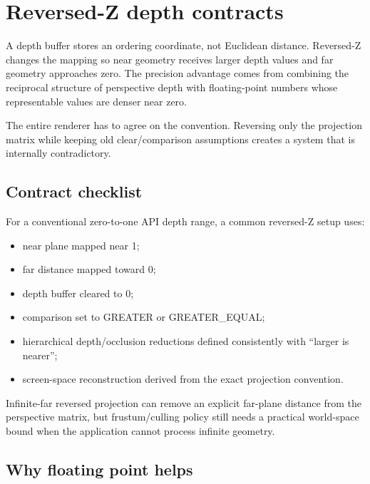 \hypertarget{appendix-275ec8847057}{}\label{referencestart:appendix-275ec8847057}
\section{Reversed-Z depth contracts}\label{appendix-275ec8847057-reversed-z-depth-contracts}

A depth buffer stores an ordering coordinate, not Euclidean distance. Reversed-Z changes the mapping so near geometry receives larger depth values and far geometry approaches zero. The precision advantage comes from combining the reciprocal structure of perspective depth with floating-point numbers whose representable values are denser near zero.

The entire renderer has to agree on the convention. Reversing only the projection matrix while keeping old clear/comparison assumptions creates a system that is internally contradictory.

\subsection{Contract checklist}\label{appendix-275ec8847057-contract-checklist}

For a conventional zero-to-one API depth range, a common reversed-Z setup uses:

\begin{itemize}
\tightlist
\item
  near plane mapped near 1;
\item
  far distance mapped toward 0;
\item
  depth buffer cleared to 0;
\item
  comparison set to GREATER or GREATER\_EQUAL;
\item
  hierarchical depth/occlusion reductions defined consistently with ``larger is nearer'';
\item
  screen-space reconstruction derived from the exact projection convention.
\end{itemize}

Infinite-far reversed projection can remove an explicit far-plane distance from the perspective matrix, but frustum/culling policy still needs a practical world-space bound when the application cannot process infinite geometry.

\subsection{Why floating point helps}\label{appendix-275ec8847057-why-floating-point-helps}

